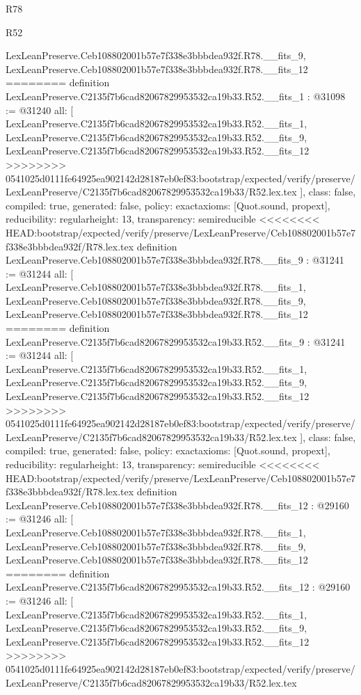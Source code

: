 \begin{lexlean}{R78}
\begin{lexlean}{R52}
\begin{coremodule}
{{{{{{{{{{{{{{{{{{{{{{{{{{{{{{{{{{{{{{{{{{{{{{{{{{{{{{{{{{{{{{{{{{{{{{{{{{{{{{{{{{{{{{{{{{{{{{{{{{{{{{{{{{{{{{{{{{{{{{{{{{{{{{{{{{{{{{{{{{{{{{{{{{{{{    LexLeanPreserve.Ceb108802001b57e7f338e3bbbdea932f.R78.__fits_9,
    LexLeanPreserve.Ceb108802001b57e7f338e3bbbdea932f.R78.__fits_12
========
definition LexLeanPreserve.C2135f7b6cad82067829953532ca19b33.R52.__fits_1 : @31098 := @31240 {
  all: [
    LexLeanPreserve.C2135f7b6cad82067829953532ca19b33.R52.__fits_1,
    LexLeanPreserve.C2135f7b6cad82067829953532ca19b33.R52.__fits_9,
    LexLeanPreserve.C2135f7b6cad82067829953532ca19b33.R52.__fits_12
>>>>>>>> 0541025d0111fe64925ea902142d28187eb0ef83:bootstrap/expected/verify/preserve/LexLeanPreserve/C2135f7b6cad82067829953532ca19b33/R52.lex.tex
  ],
  class: false,
  compiled: true,
  generated: false,
  policy: exact{axioms: [Quot.sound, propext]},
  reducibility: regular{height: 13},
  transparency: semireducible
}
<<<<<<<< HEAD:bootstrap/expected/verify/preserve/LexLeanPreserve/Ceb108802001b57e7f338e3bbbdea932f/R78.lex.tex
definition LexLeanPreserve.Ceb108802001b57e7f338e3bbbdea932f.R78.__fits_9 : @31241 := @31244 {
  all: [
    LexLeanPreserve.Ceb108802001b57e7f338e3bbbdea932f.R78.__fits_1,
    LexLeanPreserve.Ceb108802001b57e7f338e3bbbdea932f.R78.__fits_9,
    LexLeanPreserve.Ceb108802001b57e7f338e3bbbdea932f.R78.__fits_12
========
definition LexLeanPreserve.C2135f7b6cad82067829953532ca19b33.R52.__fits_9 : @31241 := @31244 {
  all: [
    LexLeanPreserve.C2135f7b6cad82067829953532ca19b33.R52.__fits_1,
    LexLeanPreserve.C2135f7b6cad82067829953532ca19b33.R52.__fits_9,
    LexLeanPreserve.C2135f7b6cad82067829953532ca19b33.R52.__fits_12
>>>>>>>> 0541025d0111fe64925ea902142d28187eb0ef83:bootstrap/expected/verify/preserve/LexLeanPreserve/C2135f7b6cad82067829953532ca19b33/R52.lex.tex
  ],
  class: false,
  compiled: true,
  generated: false,
  policy: exact{axioms: [Quot.sound, propext]},
  reducibility: regular{height: 13},
  transparency: semireducible
}
<<<<<<<< HEAD:bootstrap/expected/verify/preserve/LexLeanPreserve/Ceb108802001b57e7f338e3bbbdea932f/R78.lex.tex
definition LexLeanPreserve.Ceb108802001b57e7f338e3bbbdea932f.R78.__fits_12 : @29160 := @31246 {
  all: [
    LexLeanPreserve.Ceb108802001b57e7f338e3bbbdea932f.R78.__fits_1,
    LexLeanPreserve.Ceb108802001b57e7f338e3bbbdea932f.R78.__fits_9,
    LexLeanPreserve.Ceb108802001b57e7f338e3bbbdea932f.R78.__fits_12
========
definition LexLeanPreserve.C2135f7b6cad82067829953532ca19b33.R52.__fits_12 : @29160 := @31246 {
  all: [
    LexLeanPreserve.C2135f7b6cad82067829953532ca19b33.R52.__fits_1,
    LexLeanPreserve.C2135f7b6cad82067829953532ca19b33.R52.__fits_9,
    LexLeanPreserve.C2135f7b6cad82067829953532ca19b33.R52.__fits_12
>>>>>>>> 0541025d0111fe64925ea902142d28187eb0ef83:bootstrap/expected/verify/preserve/LexLeanPreserve/C2135f7b6cad82067829953532ca19b33/R52.lex.tex
}}}}}}}}}}}}}}}}}}}}}}}}}}}}}}}}}}}}}}}}}}}}}}}}}}}}}}}}}}}}}}}}}}}}}}}}}}}}}}}}}}}}}}}}}}}}}}}}}}}}}}}}}}}}}}}}}}}}}}}}}}}}}}}}}}}}}}}}}}}}}}}}}}}}}}}}
\end{coremodule}
\end{lexlean}
\end{lexlean}
